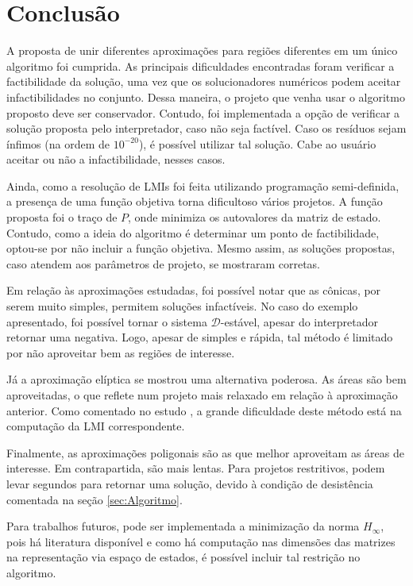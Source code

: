 \chapter{Conclusão}
A proposta de unir diferentes aproximações para regiões diferentes em um único algoritmo foi cumprida. As principais dificuldades encontradas foram verificar a factibilidade da solução, uma vez que os solucionadores numéricos podem aceitar infactibilidades no conjunto. Dessa maneira, o projeto que venha usar o algoritmo proposto deve ser conservador. Contudo, foi implementada a opção de verificar a solução proposta pelo interpretador, caso não seja factível. Caso os resíduos sejam ínfimos (na ordem de $10^{-20}$), é possível utilizar tal solução. Cabe ao usuário aceitar ou não a infactibilidade, nesses casos.

Ainda, como a resolução de LMIs foi feita utilizando programação semi-definida, a presença de uma função objetiva torna dificultoso vários projetos. A função proposta foi o traço de $P$, onde minimiza os autovalores da matriz de estado. Contudo, como a ideia do algoritmo é determinar um ponto de factibilidade, optou-se por não incluir a função objetiva. Mesmo assim, as soluções propostas, caso atendem aos parâmetros de projeto, se mostraram corretas.

Em relação às aproximações estudadas, foi possível notar que as cônicas, por serem muito simples, permitem soluções infactíveis. No caso do exemplo apresentado, foi possível tornar o sistema $\mathscr{D}$-estável, apesar do interpretador retornar uma negativa. Logo, apesar de simples e rápida, tal método é limitado por não aproveitar bem as regiões de interesse.

Já a aproximação elíptica se mostrou uma alternativa poderosa. As áreas são bem aproveitadas, o que reflete num projeto mais relaxado em relação à aproximação anterior. Como comentado no estudo , a grande dificuldade deste método está na computação da LMI correspondente.

Finalmente, as aproximações poligonais são as que melhor aproveitam as áreas de interesse. Em contrapartida, são mais lentas. Para projetos restritivos, podem levar segundos para retornar uma solução, devido à condição de desistência comentada na seção \ref{sec:Algoritmo}.

Para trabalhos futuros, pode ser implementada a minimização da norma $H_{\infty}$, pois há literatura disponível e como há computação nas dimensões das matrizes na representação via espaço de estados, é possível incluir tal restrição no algoritmo.